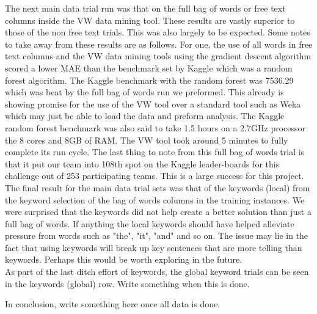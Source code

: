 The next main data trial run was that on the full bag of words or free text columns inside the VW data mining tool.
These results are vastly superior to those of the non free text trials. This was also largely to be expected. Some
notes to take away from these results are as follows. For one, the use of all words in free text columns and the
VW data mining tools using the gradient descent algorithm scored a lower MAE than the benchmark set by Kaggle
which was a random forest algorithm. The Kaggle benchmark with the random forest was 7536.29 which was beat
by the full bag of words run we preformed. This already is showing promise for the use of the VW tool over a standard
tool such as Weka which may just be able to load the data and preform analysis. The Kaggle random forest benchmark
was also said to take 1.5 hours on a 2.7GHz processor the 8 cores and 8GB of RAM. The VW tool took around 5 minutes
to fully complete its run cycle. The last thing to note from this full bag of words trial is that it put our
team into 108th spot on the Kaggle leader-boards for this challenge out of 253 participating teams. This is a large
success for this project.\\

The final result for the main data trial sets was that of the keywords (local) from the keyword selection of the bag
of words columns in the training instances. We were surprised that the keywords did not help create a better solution
than just a full bag of words. If anything the local keywords should have helped alleviate pressure from words
such as "the", "it", "and" and so on. The issue may lie in the fact that using keywords will break up key sentences
that are more telling than keywords. Perhaps this would be worth exploring in the future.\\

As part of the last ditch effort of keywords, the global keyword trials can be seen in the keywords (global) row.
Write something when this is done.

In conclusion, write something here once all data is done.